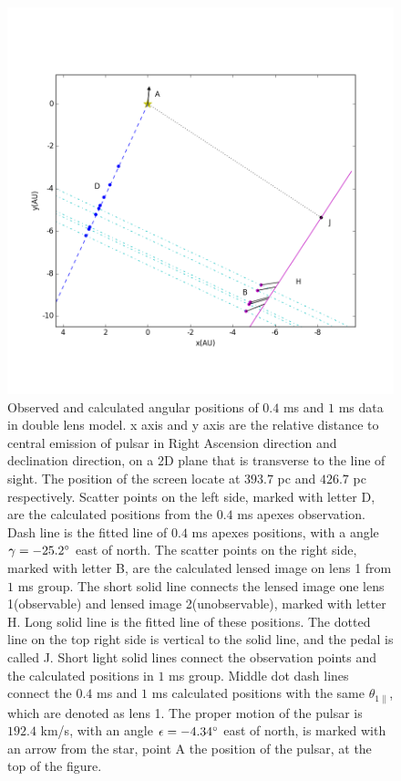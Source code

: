 \documentclass[useAMS,usenatbib]{mn2e}
\begin{document}
\begin{figure}
\centering
\includegraphics[width=1.0\textwidth, angle=0]{Double_lens_xy.png}
\caption{Observed and calculated angular positions of $0.4$ ms and $1$ ms data in double lens model. x axis and y axis are the relative distance to central emission of pulsar in Right Ascension direction and declination direction, on a 2D plane that is transverse to the line of sight. The position of the screen locate at $393.7$ pc and $426.7$ pc respectively. Scatter points on the left side, marked with letter D, are the calculated positions from the $0.4$ ms apexes observation. Dash line is the fitted line of $0.4$ ms apexes positions, with a angle $\gamma=-25.2\degree$  east of north. The scatter points on the right side, marked with letter B, are the calculated lensed image on lens 1 from $1$ ms group. The short solid line connects the lensed image one lens 1(observable) and lensed image 2(unobservable), marked with letter H. Long solid line is the fitted line of these positions. The dotted line on the top right side is vertical to the solid line, and the pedal is called J. Short light solid lines connect the observation points and the calculated positions in $1$ ms group. Middle dot dash lines connect the $0.4$ ms and $1$ ms calculated positions with the same $\theta_{1\parallel}$, which are denoted as lens 1. The proper motion of the pulsar is $192.4$ km/s, with an angle $\epsilon=-4.34\degree$ east of north, is marked with an arrow from the star, point A the position of the pulsar, at the top of the figure.}
\label{Doublelens}
\end{figure}
\end{document}
